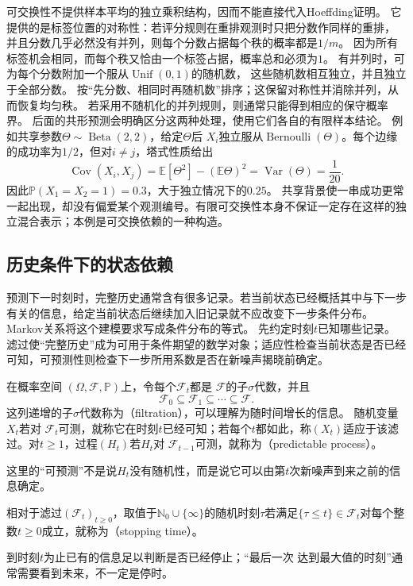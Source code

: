 可交换性不提供样本平均的独立乘积结构，因而不能直接代入Hoeffding证明。
它提供的是标签位置的对称性：若评分规则在重排观测时只把分数作同样的重排，
并且分数几乎必然没有并列，则每个分数占据每个秩的概率都是\(1/m\)。
因为所有标签机会相同，而每个秩又恰由一个标签占据，概率总和必须为\(1\)。
有并列时，可为每个分数附加一个服从\(\operatorname{Unif}(0,1)\)的随机数，
这些随机数相互独立，并且独立于全部分数。
按“先分数、相同时再随机数”排序；这保留对称性并消除并列，从而恢复均匀秩。
若采用不随机化的并列规则，则通常只能得到相应的保守概率界。
后面的共形预测会明确区分这两种处理，使用它们各自的有限样本结论。
例如共享参数\(\Theta\sim\operatorname{Beta}(2,2)\)，给定\(\Theta\)后
\(X_i\)独立服从\(\operatorname{Bernoulli}(\Theta)\)。每个边缘的成功率为\(1/2\)，但对\(i\ne j\)，塔式性质给出
\[
\operatorname{Cov}(X_i,X_j)
=\mathbb E[\Theta^2]-(\mathbb E\Theta)^2
=\operatorname{Var}(\Theta)=\frac1{20}.
\]
因此\(\mathbb P(X_1=X_2=1)=0.3\)，大于独立情况下的\(0.25\)。
共享背景使一串成功更常一起出现，却没有偏爱某个观测编号。有限可交换性本身不保证一定存在这样的独立混合表示；本例是可交换依赖的一种构造。

\subsection{历史条件下的状态依赖}

预测下一时刻时，完整历史通常含有很多记录。若当前状态已经概括其中与下一步有关的信息，给定当前状态后继续加入旧记录就不应改变下一步条件分布。Markov关系将这个建模要求写成条件分布的等式。
\label{sec:rv-markov}
\label{sec:stoch-martingales-stopping-sequential-concentration}
先约定时刻\(t\)已知哪些记录。滤过使“完整历史”成为可用于条件期望的数学对象；适应性检查当前状态是否已经可知，可预测性则检查下一步所用系数是否在新噪声揭晓前确定。
\begin{definition}[滤过、适应与可预测性]
  \label{def:stoch-filtration-adaptation-predictability}
在概率空间
$(\Omega,\mathcal{F},\mathbb{P})$上，令每个$\mathcal{F}_t$都是
$\mathcal{F}$的子$\sigma$代数，并且
\[
  \mathcal{F}_0\subseteq\mathcal{F}_1\subseteq\cdots\subseteq\mathcal{F}.
\]
这列递增的子$\sigma$代数称为（filtration），可以理解为随时间增长的信息。
随机变量$X_t$若对
$\mathcal{F}_t$可测，就称它在时刻$t$已经可知；若每个$t$都如此，称$(X_t)$适应于该滤过。对$t\geq1$，过程$(H_t)$若$H_t$对
$\mathcal{F}_{t-1}$可测，就称为（predictable process）。
\end{definition}
这里的“可预测”不是说$H_t$没有随机性，而是说它可以由第$t$次新噪声到来之前的信息确定。
\begin{definition}[停时]
  \label{def:stoch-stopping-time}
  相对于滤过\((\mathcal F_t)_{t\geq0}\)，取值于\(\mathbb N_0\cup\{\infty\}\)的随机时刻$\tau$若满足$\{\tau\leq t\}\in\mathcal{F}_t$对每个整数$t\geq0$成立，就称为（stopping time）。
\end{definition}
到时刻$t$为止已有的信息足以判断是否已经停止；“最后一次
达到最大值的时刻”通常需要看到未来，不一定是停时。


